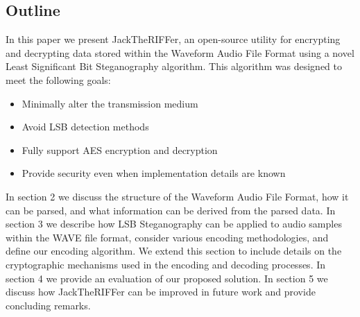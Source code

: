 \subsection{Outline}
In this paper we present JackTheRIFFer, an open-source utility for encrypting and decrypting data stored within the Waveform Audio File Format using a novel Least Significant Bit Steganography algorithm. This algorithm was designed to meet the following goals:
\begin{itemize}
\item Minimally alter the transmission medium
\item Avoid LSB detection methods
\item Fully support AES encryption and decryption
\item Provide security even when implementation details are known
\end{itemize}
In section 2 we discuss the structure of the Waveform Audio File Format, how it can be parsed, and what information can be derived from the parsed data. In section 3 we describe how LSB Steganography can be applied to audio samples within the WAVE file format, consider various encoding methodologies, and define our encoding algorithm. We extend this section to include details on the cryptographic mechanisms used in the encoding and decoding processes. In section 4 we provide an evaluation of our proposed solution.  In section 5 we discuss how JackTheRIFFer can be improved in future work and provide concluding remarks.


